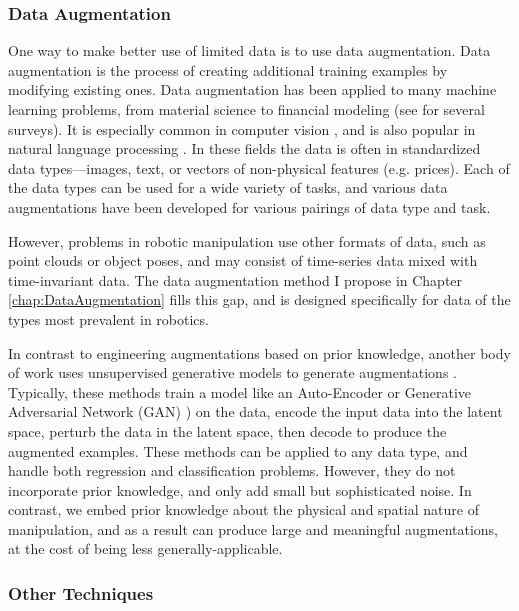\subsubsection{Data Augmentation}

One way to make better use of limited data is to use data augmentation. Data augmentation is the process of creating additional training examples by modifying existing ones. Data augmentation has been applied to many machine learning problems, from material science \cite{MaterialsAEOhno2020} to financial modeling \cite{PriceForecastingAE2021} (see \cite{TimeSeriesSurveyIwana2020,NLPSurveyFeng2021,ImageAugSurvey2019} for several surveys). It is especially common in computer vision \cite{ImageAugSurvey2019,BestPractice2003,AutoAugment,RLAugLaskin2020,Augerino2020}, and is also popular in natural language processing \cite{NLPSurveyFeng2021,NLPMa2019}. In these fields the data is often in standardized data types---images, text, or vectors of non-physical features (e.g. prices). Each of the data types can be used for a wide variety of tasks, and various data augmentations have been developed for various pairings of data type and task.

However, problems in robotic manipulation use other formats of data, such as point clouds or object poses, and may consist of time-series data mixed with time-invariant data. The data augmentation method I propose in Chapter \ref{chap:DataAugmentation} fills this gap, and is designed specifically for data of the types most prevalent in robotics.

In contrast to engineering augmentations based on prior knowledge, another body of work uses unsupervised generative models to generate augmentations \cite{BayesianDATran2017,MaterialsAEOhno2020,PriceForecastingAE2021}. Typically, these methods train a model like an Auto-Encoder or Generative Adversarial Network (GAN) \cite{GANGoodfellow14}) on the data, encode the input data into the latent space, perturb the data in the latent space, then decode to produce the augmented examples. These methods can be applied to any data type, and handle both regression and classification problems. However, they do not incorporate prior knowledge, and only add small but sophisticated noise. In contrast, we embed prior knowledge about the physical and spatial nature of manipulation, and as a result can produce large and meaningful augmentations, at the cost of being less generally-applicable.

\subsubsection{Other Techniques}

